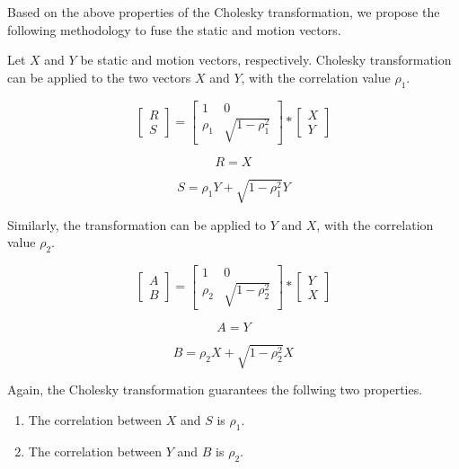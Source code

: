 Based on the above properties of the Cholesky transformation, we propose the following methodology to fuse the static and
motion vectors.

Let $X$ and $Y$ be static and motion vectors, respectively. Cholesky transformation can be applied to the two vectors $X$ and $Y$, 
with the correlation value $\rho_{1}$.

\[
\begin{bmatrix}
    R     \\
    S     
\end{bmatrix}
=
\begin{bmatrix}
    1  & 0 \\
    \rho_{1}  & \sqrt{1-\rho_{1}^2}    
\end{bmatrix}
*
\begin{bmatrix}
    X    \\
    Y     
\end{bmatrix}
\]

\begin{equation}
R = X
\end{equation}

\begin{equation}
S = \rho_{1} Y + \sqrt{1-\rho_{1}^2}Y
\end{equation}

Similarly, the transformation can be applied to $Y$ and $X$, with the correlation value $\rho_{2}$.


\[
\begin{bmatrix}
    A     \\
    B     
\end{bmatrix}
=
\begin{bmatrix}
    1  & 0 \\
    \rho_{2}  & \sqrt{1-\rho_{2}^2}    
\end{bmatrix}
*
\begin{bmatrix}
    Y    \\
    X     
\end{bmatrix}
\]

\begin{equation}
A = Y
\end{equation}

\begin{equation}
B = \rho_{2} X + \sqrt{1-\rho_{2}^2}X
\end{equation}

Again, the Cholesky transformation guarantees the follwing two properties.


\begin{enumerate}
  \item The correlation between $X$ and $S$ is $\rho_{1}$.
  \item The correlation between $Y$ and $B$ is $\rho_{2}$.
\end{enumerate}

